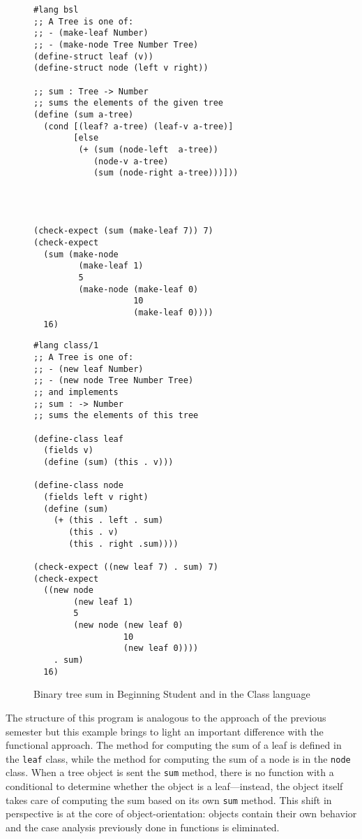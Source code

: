 \documentclass[submission,copyright]{eptcs}
\begin{document}
\begin{figure}[h!]
\begin{minipage}[t]{3.5in}
\begin{verbatim}
#lang bsl
;; A Tree is one of:
;; - (make-leaf Number)
;; - (make-node Tree Number Tree)
(define-struct leaf (v))
(define-struct node (left v right))

;; sum : Tree -> Number
;; sums the elements of the given tree
(define (sum a-tree)
  (cond [(leaf? a-tree) (leaf-v a-tree)]
        [else
         (+ (sum (node-left  a-tree))
            (node-v a-tree)
            (sum (node-right a-tree)))]))




(check-expect (sum (make-leaf 7)) 7)
(check-expect 
  (sum (make-node
         (make-leaf 1)
         5 
         (make-node (make-leaf 0)
                    10
                    (make-leaf 0))))
  16)
\end{verbatim}
\end{minipage}
\begin{minipage}[t]{3in}
\begin{verbatim}
#lang class/1
;; A Tree is one of:
;; - (new leaf Number)
;; - (new node Tree Number Tree)
;; and implements
;; sum : -> Number
;; sums the elements of this tree

(define-class leaf
  (fields v)
  (define (sum) (this . v)))

(define-class node
  (fields left v right)
  (define (sum)
    (+ (this . left . sum)
       (this . v)
       (this . right .sum))))

(check-expect ((new leaf 7) . sum) 7)
(check-expect 
  ((new node
        (new leaf 1)
        5 
        (new node (new leaf 0) 
                  10
                  (new leaf 0))))
    . sum)
  16)
\end{verbatim}
\end{minipage}
\caption{Binary tree sum in Beginning Student and in the Class language}
\label{fig:tree}
\end{figure}

The structure of this program is analogous to the approach of
the previous semester but this example brings to light an important
difference with the functional approach.  The method for computing the
sum of a leaf is defined in the {\tt leaf} class, while the
method for computing the sum of a node is in the {\tt node} class.
When a tree object is sent the {\tt sum} method, there is no function
with a conditional to determine whether the object is a
leaf---instead, the object itself takes care of computing the sum
based on its own {\tt sum} method.  This shift in perspective
is at the core of object-orientation: objects contain their own
behavior and the case analysis previously done in functions is
eliminated.
\end{document}
